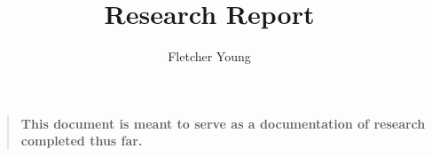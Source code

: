 \documentclass[runningheads,a4paper]{llncs}
\newenvironment{sciabstract}{%
\begin{quote} \bf}
{\end{quote}}
\begin{document}
	\mainmatter  %
	\title{Research Report}
	\author{Fletcher Young}%
	
	\maketitle
	\begin{sciabstract}
		This document is meant to serve as a documentation of research completed thus far.
	\end{sciabstract}
	
\end{document}
